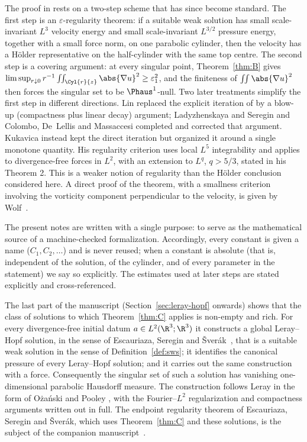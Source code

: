 \documentclass[11pt,reqno]{amsart}
\begin{document}
The proof in \cite{CKN1982} rests on a two-step scheme that has since become
standard. The first step is an $\varepsilon$-regularity theorem: if a suitable
weak solution has small scale-invariant $L^{3}$ velocity energy and small
scale-invariant $L^{3/2}$ pressure energy, together with a small force norm,
on one parabolic cylinder, then the velocity has a H\"older representative
on the half-cylinder with the same top centre. The second step
is a covering argument: at every singular point, Theorem~\ref{thm:B} gives
$\limsup_{r\downarrow0}r^{-1}\iint_{\Cyl{r}{z}}\abs{\nabla u}^{2}\ge\varepsilon_{1}^{2}$,
and the finiteness of $\iint\abs{\nabla u}^{2}$ then
forces the singular set to be $\Phaus^{1}$-null. Two later treatments simplify
the first step in different directions. Lin \cite{Lin1998} replaced the explicit
iteration of \cite{CKN1982} by a blow-up (compactness plus linear decay)
argument; Ladyzhenskaya and Seregin \cite{LadyzhenskayaSeregin1999} and
Colombo, De~Lellis and Massaccesi \cite{ColomboDeLellisMassaccesi2018} completed
and corrected that argument. Kukavica \cite{Kukavica2008} instead kept the
direct iteration but organized it around a single monotone quantity. His
regularity criterion uses local $L^{5}$ integrability and applies to
divergence-free forces in $L^{2}$, with an extension to $L^{q}$, $q>5/3$,
stated in his Theorem 2. This is a weaker notion of regularity than the
H\"older conclusion considered here.
A direct proof of the theorem, with a smallness criterion involving the
vorticity component perpendicular to the velocity, is given by Wolf~\cite{Wolf2008}.

The present notes are written with a single purpose: to serve as the
mathematical source of a machine-checked formalization. Accordingly,
every constant is given a name ($C_{1},C_{2},\dots$) and is never
reused; when a constant is absolute (that is, independent of the solution, of
the cylinder, and of every parameter in the statement) we say so explicitly.
The estimates used at later steps are stated explicitly and cross-referenced.
%
%
%
%
%

The last part of the manuscript (Section~\ref{sec:leray-hopf} onwards) shows that the
class of solutions to which Theorem~\ref{thm:C} applies is non-empty and rich.
For every divergence-free initial datum $a\in L^{2}(\R^{3};\R^{3})$ it constructs
a global Leray--Hopf solution, in the sense of Escauriaza, Seregin and
\v{S}ver\'ak~\cite{ESS2003}, that is a suitable weak solution in the sense of
Definition~\ref{def:sws}; it identifies the canonical pressure of every
Leray--Hopf solution; and it carries out the same construction with a force.
Consequently the singular set of such a solution has vanishing
one-dimensional parabolic Hausdorff measure. The construction follows Leray
\cite{Leray1934} in the form of O\.za\'nski and Pooley
\cite{OzanskiPooley2018}, with the Fourier--$L^{2}$ regularization and
compactness arguments written out in full. The endpoint regularity theorem
of Escauriaza, Seregin and \v{S}ver\'ak, which uses Theorem~\ref{thm:C} and
these solutions, is the subject of the companion manuscript~\cite{ESSLean}.
\end{document}
